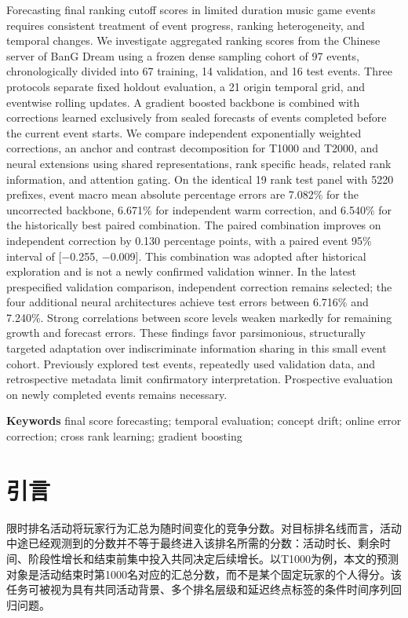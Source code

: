 \documentclass[a4paper,11pt,fontset=none]{ctexart}
\begin{document}
Forecasting final ranking cutoff scores in limited duration music game events requires consistent treatment of event progress, ranking heterogeneity, and temporal changes. We investigate aggregated ranking scores from the Chinese server of BanG Dream using a frozen dense sampling cohort of 97 events, chronologically divided into 67 training, 14 validation, and 16 test events. Three protocols separate fixed holdout evaluation, a 21 origin temporal grid, and eventwise rolling updates. A gradient boosted backbone is combined with corrections learned exclusively from sealed forecasts of events completed before the current event starts. We compare independent exponentially weighted corrections, an anchor and contrast decomposition for T1000 and T2000, and neural extensions using shared representations, rank specific heads, related rank information, and attention gating. On the identical 19 rank test panel with 5220 prefixes, event macro mean absolute percentage errors are 7.082\% for the uncorrected backbone, 6.671\% for independent warm correction, and 6.540\% for the historically best paired combination. The paired combination improves on independent correction by 0.130 percentage points, with a paired event 95\% interval of {[}−0.255, −0.009{]}. This combination was adopted after historical exploration and is not a newly confirmed validation winner. In the latest prespecified validation comparison, independent correction remains selected; the four additional neural architectures achieve test errors between 6.716\% and 7.240\%. Strong correlations between score levels weaken markedly for remaining growth and forecast errors. These findings favor parsimonious, structurally targeted adaptation over indiscriminate information sharing in this small event cohort. Previously explored test events, repeatedly used validation data, and retrospective metadata limit confirmatory interpretation. Prospective evaluation on newly completed events remains necessary.

\textbf{Keywords} final score forecasting; temporal evaluation; concept drift; online error correction; cross rank learning; gradient boosting

\section{引言}

限时排名活动将玩家行为汇总为随时间变化的竞争分数。对目标排名线而言，活动中途已经观测到的分数并不等于最终进入该排名所需的分数：活动时长、剩余时间、阶段性增长和结束前集中投入共同决定后续增长。以T1000为例，本文的预测对象是活动结束时第1000名对应的汇总分数，而不是某个固定玩家的个人得分。该任务可被视为具有共同活动背景、多个排名层级和延迟终点标签的条件时间序列回归问题。
\end{document}
